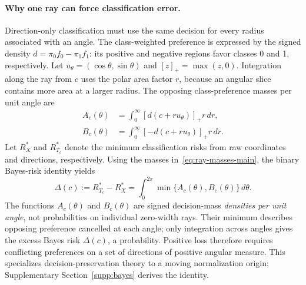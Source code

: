 \paragraph{Why one ray can force classification error.}
Direction-only classification must use the same decision for every radius associated with an angle. The class-weighted preference is expressed by the signed density $d=\pi_0f_0-\pi_1f_1$: its positive and negative regions favor classes 0 and 1, respectively. Let $u_\theta=(\cos\theta,\sin\theta)$ and $[z]_+=\max(z,0)$. Integration along the ray from $c$ uses the polar area factor $r$, because an angular slice contains more area at a larger radius. The opposing class-preference masses per unit angle are
\begin{equation}
\begin{aligned}
 A_c(\theta)&=\int_0^\infty[d(c+ru_\theta)]_+r\,dr,\\
 B_c(\theta)&=\int_0^\infty[-d(c+ru_\theta)]_+r\,dr.
\end{aligned}
\label{eq:ray-masses-main}
\end{equation}
Let $R_X^*$ and $R^*_{T_c}$ denote the minimum classification risks from raw coordinates and directions, respectively. Using the masses in~\eqref{eq:ray-masses-main}, the binary Bayes-risk identity yields
\begin{equation}
 \Delta(c):=R^*_{T_c}-R_X^*
 =\int_0^{2\pi}\min\{A_c(\theta),B_c(\theta)\}\,d\theta.
 \label{eq:ray-loss-main}
\end{equation}
The functions $A_c(\theta)$ and $B_c(\theta)$ are signed decision-mass \emph{densities per unit angle}, not probabilities on individual zero-width rays. Their minimum describes opposing preference cancelled at each angle; only integration across angles gives the excess Bayes risk $\Delta(c)$, a probability. Positive loss therefore requires conflicting preferences on a set of directions of positive angular measure. This specializes decision-preservation theory \citep{Silva2012,Silva2024} to a moving normalization origin; Supplementary Section~\ref{supp:bayes} derives the identity.

